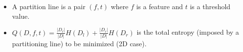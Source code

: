 
\begin{itemize}
    \item A partition line is a pair $(f,t)$ where $f$ is a feature and $t$ is a threshold value.
    \item $Q(D,f,t)=\frac{|D_\ell|}{|D|}H(D_l)+\frac{|D_r|}{|D|}H(D_r)$ is the total entropy (imposed by a partitioning line) to be minimized (2D case).
\end{itemize}